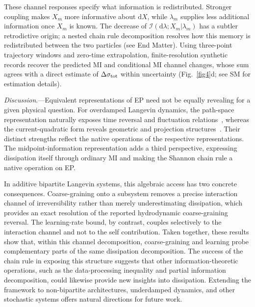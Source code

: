 \documentclass[
 longbibliography,
 twocolumn,
 superscriptaddress,
 amsmath,
 amssymb,
 amsthm,
 amsfonts,
 prl,
 floatfix,
]{revtex4-2}
\begin{document}
These channel responses specify what information is redistributed. Stronger coupling makes $X_m$ more informative about $\mathrm dX$, while $\lambda_m$ supplies less additional information once $X_m$ is known. The decrease of $\mathcal I(\mathrm d\lambda;X_m|\lambda_m)$ has a subtler retrodictive origin; a nested chain rule decomposition resolves how this memory is redistributed between the two particles (see End Matter).
Using three-point trajectory windows and zero-time extrapolation, finite-resolution synthetic records recover the predicted MI and conditional MI channel changes, whose sum agrees with a direct estimate of \(\Delta\sigma_{\rm tot}\) within uncertainty (Fig.~\ref{fig4}d; see SM for estimation details).

\textit{Discussion}.---Equivalent representations of EP need not be equally revealing for a given physical question. For overdamped Langevin dynamics, the path-space representation naturally exposes time reversal and fluctuation relations~\cite{Maes2003time-reversal,Seifert2005Entropy}, whereas the current-quadratic form reveals geometric and projection structures~\cite{dechant2022geometricPRR,frishman2020learning}. Their distinct strengths reflect the native operations of the respective representations. 
The midpoint-information representation adds a third perspective, expressing dissipation itself through ordinary MI and making the Shannon chain rule a native operation on EP. 

In additive bipartite Langevin systems, this algebraic access has two concrete consequences. Coarse-graining onto a subsystem removes a precise interaction channel of irreversibility rather than merely underestimating dissipation, which provides an exact resolution of the reported hydrodynamic coarse-graining reversal. The learning-rate bound, by contrast, couples selectively to the interaction channel and not to the self contribution. Taken together, these results show that, within this channel decomposition, coarse-graining and learning probe complementary parts of the same dissipation decomposition.
The success of the chain rule in exposing this structure suggests that other information-theoretic operations, such as the data-processing inequality and partial information decomposition, could likewise provide new insights into dissipation. Extending the framework to non-bipartite architectures, underdamped dynamics, and other stochastic systems offers natural directions for future work.
\end{document}
